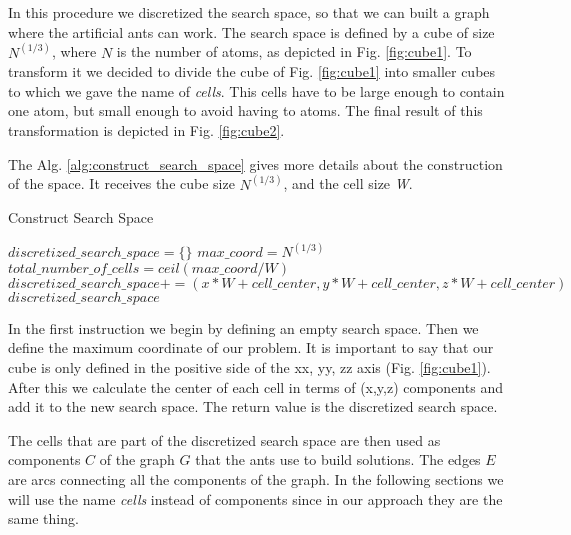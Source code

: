 	In this procedure we discretized the search space, so that we can built a graph where the artificial ants can work.
	The search space is defined by a cube of size $N^{(1/3)}$, where $N$ is the number of atoms, as depicted in Fig. \ref{fig:cube1}. To transform it we decided to divide the cube of Fig. \ref{fig:cube1} into smaller cubes to which we gave the name of \emph{cells}. This cells have to be large enough to contain one atom, but small enough to avoid having to atoms. The final result of this transformation is depicted in Fig. \ref{fig:cube2}.  
	
	
	\pagebreak
	The Alg. \ref{alg:construct_search_space} gives more details about the construction of the space. It receives the cube size $N^{(1/3)}$, and the cell size \emph{W}.
	
	\begin{algorithm}
		\caption{Construct Search Space}
		\label{alg:construct_search_space}
		\begin{algorithmic}
		\STATE $discretized\_search\_space = \{\}$
		\STATE $max\_coord = N^{(1/3)}$
		\STATE $total\_number\_of\_cells = ceil(max\_coord / W)$
					\STATE $discretized\_search\_space += (x * W + cell\_center,  y * W + cell\_center, z * W + cell\_center)$
				\ENDFOR
			\ENDFOR
		\ENDFOR
		\RETURN $discretized\_search\_space$
		\end{algorithmic}
	\end{algorithm}

	In the first instruction we begin by defining an empty search space. Then we define the maximum coordinate of our problem. It is important to say that our cube is only defined in the positive side of the xx, yy, zz axis (Fig. \ref{fig:cube1}). After this we calculate the center of each cell in terms of (x,y,z) components and add it to the new search space. 
	The return value is the discretized search space.
	
	The cells that are part of the discretized search space are then used as components $C$ of the graph $G$ that the ants use to build solutions. The edges $E$ are arcs connecting all the components of the graph. In the following sections we will use the name \emph{cells} instead of components since in our approach they are the same thing.
	
